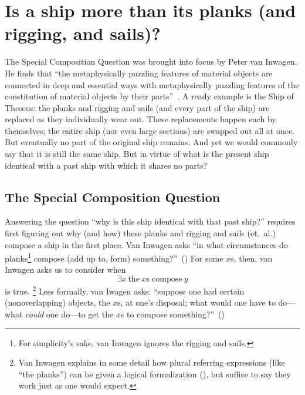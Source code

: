

\section{Is a ship more than its planks (and rigging, and sails)?}
The Special Composition Question was brought into focus by Peter van Inwagen. He finds that ``the metaphysically puzzling features of material objects are connected in deep and essential ways with metaphysically puzzling features of the constitution of material objects by their parts''~\citep[18]{inwagen1995}. A ready example is the Ship of Theseus: the planks and rigging and sails (and every part of the ship) are replaced as they individually wear out. These replacements happen each by themselves; the entire ship (nor even large sections) are swapped out all at once. But eventually no part of the original ship remains. And yet we would commonly say that it is still the same ship. But in virtue of what is the present ship identical with a past ship with which it shares no parts?

\subsection{The Special Composition Question}
Answering the question ``why is this ship identical with that past ship?'' requires first figuring out why (and how) these planks and rigging and sails (et.\ al.) compose a ship in the first place. Van Inwagen asks ``in what circumstances do planks\footnote{For simplicity's sake, van Inwagen ignores the rigging and sails.} compose (add up to, form) something?''~(\citeyear[21]{inwagen1995}) For some $x$s, then, van Inwagen asks us to consider when
\begin{equation}
\exists x\ \text{the}\ x\text{s compose}\ y
\end{equation}
is true.%
\footnote{Van Inwagen explains in some detail how plural referring expressions (like ``the planks'') can be given a logical formalization (\citeyear[23--28]{inwagen1995}), but suffice to say they work just as one would expect.} %
%
Less formally, van Iwagen asks: ``suppose one had certain (nonoverlapping) objects, the $x$s, at one's disposal; what would one have to do---what {\em could} one do---to get the $x$s to compose something?''~(\citeyear[31]{inwagen1995})

